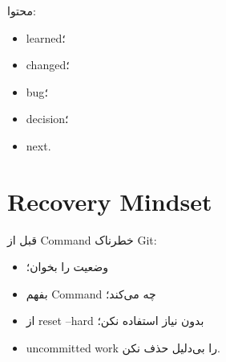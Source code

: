 محتوا:
\begin{itemize}
  \item learned؛
  \item changed؛
  \item bug؛
  \item decision؛
  \item next.
\end{itemize}

\section{Recovery Mindset}

قبل از Command خطرناک Git:
\begin{itemize}
  \item وضعیت را بخوان؛
  \item بفهم Command چه می‌کند؛
  \item از reset --hard بدون نیاز استفاده نکن؛
  \item uncommitted work را بی‌دلیل حذف نکن.
\end{itemize}
